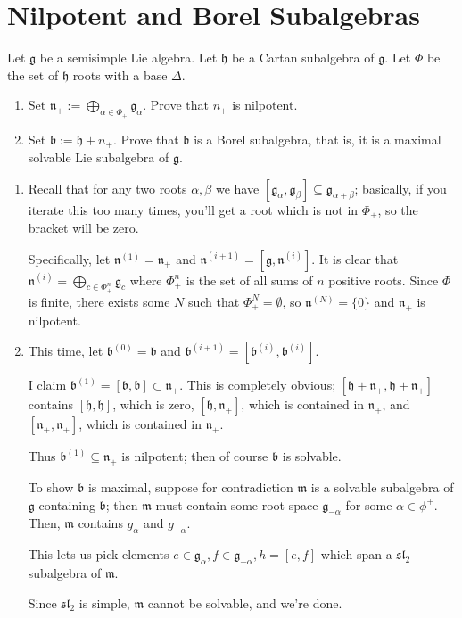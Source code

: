 \documentclass[11pt, headheight=30pt]{scrartcl}
\begin{document}
\section{Nilpotent and Borel Subalgebras}

\begin{prob*}
Let $\mathfrak g$ be a semisimple Lie algebra. Let $\mathfrak h$ be a Cartan subalgebra of $\mathfrak g$. Let $\Phi$ be the set of $\mathfrak h$ roots with a base $\Delta$.
\begin{enumerate}
    \item Set $\mathfrak n_+ := \bigoplus_{\alpha \in \Phi_+} \mathfrak g_\alpha$. Prove that $n_+$ is nilpotent.
    \item Set $\mathfrak b := \mathfrak h + n_+$. Prove that $\mathfrak b$ is a Borel subalgebra, that is, it is a maximal solvable Lie subalgebra of $\mathfrak g$.
\end{enumerate}

\end{prob*}
\begin{enumerate}
    \item Recall that for any two roots $\alpha,\beta$ we have $[\mathfrak g_\alpha, \mathfrak g_\beta] \subseteq \mathfrak g_{\alpha + \beta}$; basically, if you iterate
    this too many times, you'll get a root which is not in $\Phi_+$, so the bracket will be zero.
    
    Specifically, let $\mathfrak n^{(1)} = \mathfrak n_+$ and $\mathfrak n^{(i+1)} = [\mathfrak g, \mathfrak n^{(i)}]$. It is clear that $\mathfrak n^{(i)} = \bigoplus_{c \in \Phi_+^n} \mathfrak g_c$ where $\Phi_+^n$ is the set of all sums of $n$ positive roots.
    Since $\Phi$ is finite, there exists some $N$ such that $\Phi_+^N = \emptyset$, so $\mathfrak n^{(N)} = \{0\}$ and $\mathfrak n_+$ is nilpotent.
    \item This time, let $\mathfrak b^{(0)} = \mathfrak b$ and $\mathfrak b^{(i+1)} = [\mathfrak b^{(i)}, \mathfrak b^{(i)}]$. 
    
    I claim $\mathfrak b^{(1)} = [\mathfrak b, \mathfrak b]\subset \mathfrak n_+$.
    This is completely obvious; $[\mathfrak h + \mathfrak n_+, \mathfrak h + \mathfrak n_+]$ contains $[\mathfrak h, \mathfrak h]$, which is zero, $[\mathfrak h, \mathfrak n_+]$, which is contained in $\mathfrak n_+$, and $[\mathfrak n_+, \mathfrak n_+]$, which is contained in $\mathfrak n_+$.

    Thus $\mathfrak b^{(1)} \subseteq \mathfrak n_+$ is nilpotent; then of course $\mathfrak b$ is solvable.
    
    To show $\mathfrak b$ is maximal, suppose for contradiction $\mathfrak m$ is a solvable subalgebra of $\mathfrak g$ containing $\mathfrak b$; then $\mathfrak m$ must contain some root space $\mathfrak g_{-\alpha}$ for some $\alpha \in \phi^+$.
    Then, $\mathfrak m$ contains $g_{\alpha}$ and $g_{-\alpha}$.
    
    This lets us pick elements $e \in \mathfrak g_\alpha, f \in \mathfrak g_{-\alpha}, h = [e,f]$ which span a $\mathfrak{sl}_2$ subalgebra of $\mathfrak m$.
    
    Since $\mathfrak{sl}_2$ is simple, $\mathfrak m$ cannot be solvable, and we're done.
\end{enumerate}
\end{document}
